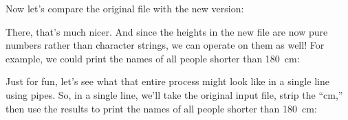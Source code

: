 \documentclass[10pt,a4]{article}
\begin{document}
\ttfamily
\colorbox{black}{}
\normalfont

Now let's compare the original file with the new version:

\ttfamily
\colorbox{black}{}

\ttfamily
\colorbox{black}{}

\colorbox{black}{}
\normalfont

There, that's much nicer. And since the heights in the new file are now pure numbers rather than character strings, we can operate on them as well! For example, we could print the names of all people shorter than 180~cm:

\ttfamily
\colorbox{black}{}
\normalfont

Just for fun, let's see what that entire process might look like in a single line using pipes. So, in a single line, we'll take the original input file, strip the ``cm,'' then use the results to print the names of all people shorter than 180~cm:
\end{document}
